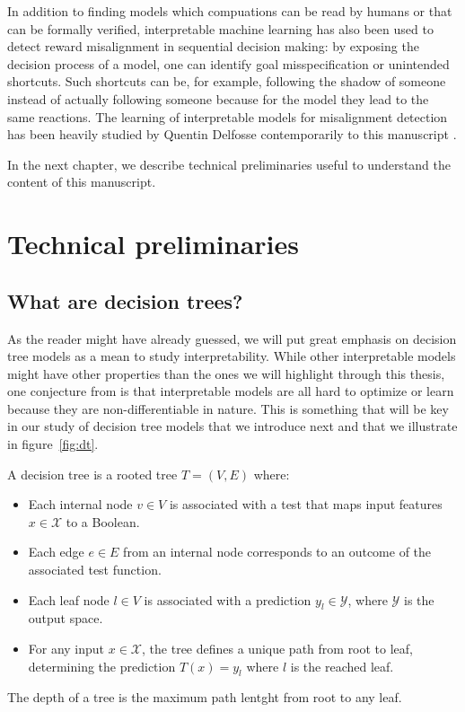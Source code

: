 In addition to finding models which compuations can be read by humans or that can be formally verified, interpretable machine learning has also been used to detect reward misalignment in sequential decision making: by exposing the decision process of a model, one can identify goal misspecification or unintended shortcuts.
Such shortcuts can be, for example, following the shadow of someone instead of actually following someone because for the model they lead to the same reactions.
The learning of interpretable models for misalignment detection has been heavily studied by Quentin Delfosse contemporarily to this manuscript \cite{scobots,shindo2024blendrl,nudge,ocatari}.

In the next chapter, we describe technical preliminaries useful to understand the content of this manuscript.

\chapter*{Technical preliminaries}\label{sec:technicals}

\section{What are decision trees?}\label{sec:dt}

As the reader might have already guessed, we will put great emphasis on decision tree models as a mean to study interpretability.
While other interpretable models might have other properties than the ones we will highlight through this thesis, one conjecture from \cite{glanois-survey} is that interpretable models are all hard to optimize or learn because they are non-differentiable in nature.
This is something that will be key in our study of decision tree models that we introduce next and that we illustrate in figure~\ref{fig:dt}.

\begin{definition}
    A decision tree is a rooted tree $T = (V, E)$ where:
    \begin{itemize}
    \item Each internal node $v \in V$ is associated with a test that maps input features $x \in \mathcal{X}$ to a Boolean.
    \item Each edge $e \in E$ from an internal node corresponds to an outcome of the associated test function.
    \item Each leaf node $l \in V$ is associated with a prediction $y_l \in \mathcal{Y}$, where $\mathcal{Y}$ is the output space.
    \item For any input $x \in \mathcal{X}$, the tree defines a unique path from root to leaf, determining the prediction $T(x) = y_l$ where $l$ is the reached leaf.
    \end{itemize}
    The depth of a tree is the maximum path lentght from root to any leaf.
    \end{definition}

